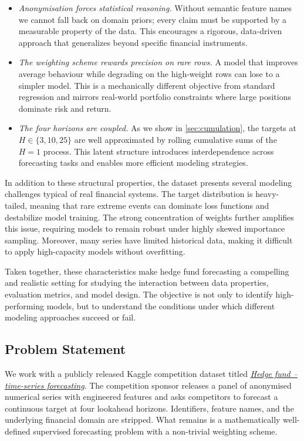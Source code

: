 \begin{itemize}
  \item \emph{Anonymisation forces statistical reasoning.} Without semantic feature names we cannot fall back on domain priors; every claim must be supported by a measurable property of the data. This encourages a rigorous, data-driven approach that generalizes beyond specific financial instruments.
  
  \item \emph{The weighting scheme rewards precision on rare rows.} A model that improves average behaviour while degrading on the high-weight rows can lose to a simpler model. This is a mechanically different objective from standard regression and mirrors real-world portfolio constraints where large positions dominate risk and return.
  
  \item \emph{The four horizons are coupled.} As we show in \cref{sec:cumulation}, the targets at $H \in \{3,10,25\}$ are well approximated by rolling cumulative sums of the $H=1$ process. This latent structure introduces interdependence across forecasting tasks and enables more efficient modeling strategies.
\end{itemize}

In addition to these structural properties, the dataset presents several modeling challenges typical of real financial systems. The target distribution is heavy-tailed, meaning that rare extreme events can dominate loss functions and destabilize model training. The strong concentration of weights further amplifies this issue, requiring models to remain robust under highly skewed importance sampling. Moreover, many series have limited historical data, making it difficult to apply high-capacity models without overfitting.

Taken together, these characteristics make hedge fund forecasting a compelling and realistic setting for studying the interaction between data properties, evaluation metrics, and model design. The objective is not only to identify high-performing models, but to understand the conditions under which different modeling approaches succeed or fail.

\subsection{Problem Statement}
\label{sec:intro:problem}

We work with a publicly released Kaggle competition dataset titled \href{https://www.kaggle.com/competitions/ts-forecasting}{\emph{Hedge fund -- time-series forecasting}}. The competition sponsor releases a panel of anonymised numerical series with engineered features and asks competitors to forecast a continuous target at four lookahead horizons. Identifiers, feature names, and the underlying financial domain are stripped. What remains is a mathematically well-defined supervised forecasting problem with a non-trivial weighting scheme.

